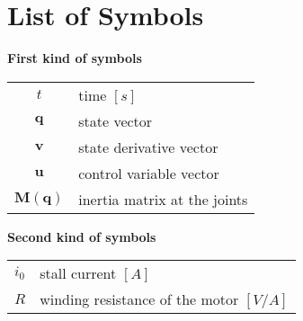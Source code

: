 \chapter*{List of Symbols}

\textbf{First kind of symbols}\\
\begin{tabular}{cp{\textwidth}}
  $t$ & time $[s]$\\
  $\mathbf{q}$ & state vector\\
  $\mathbf{v}$ & state derivative vector\\
  $\mathbf{u}$ & control variable vector\\
  $\mathbf{M(q)}$ & inertia matrix at the joints\\
\end{tabular}

\textbf{Second kind of symbols}\\
\begin{tabular}{cp{\textwidth}}
  $i_0$ & stall current $[A]$\\
  $R$ & winding resistance of the motor $[V/A]$\\
\end{tabular}
